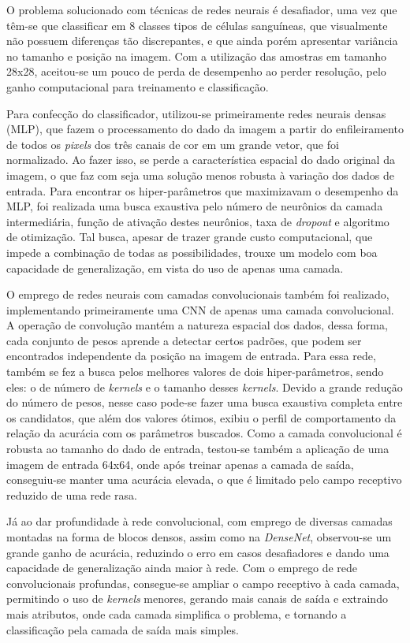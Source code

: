 O problema solucionado com técnicas de redes neurais é desafiador, uma vez que têm-se que classificar em 8 classes tipos de células sanguíneas, que visualmente não possuem diferenças tão discrepantes, e que ainda porém apresentar variância no tamanho e posição na imagem. Com a utilização das amostras em tamanho 28x28, aceitou-se um pouco de perda de desempenho ao perder resolução, pelo ganho computacional para treinamento e classificação.

Para confecção do classificador, utilizou-se primeiramente redes neurais densas (MLP), que fazem o processamento do dado da imagem a partir do enfileiramento de todos os \textit{pixels} dos três canais de cor em um grande vetor, que foi normalizado. Ao fazer isso, se perde a característica espacial do dado original da imagem, o que faz com seja uma solução menos robusta à variação dos dados de entrada. Para encontrar os hiper-parâmetros que maximizavam o desempenho da MLP, foi realizada uma busca exaustiva pelo número de neurônios da camada intermediária, função de ativação destes neurônios, taxa de \textit{dropout} e algoritmo de otimização. Tal busca, apesar de trazer grande custo computacional, que impede a combinação de todas as possibilidades, trouxe um modelo com boa capacidade de generalização, em vista do uso de apenas uma camada.

O emprego de redes neurais com camadas convolucionais também foi realizado, implementando primeiramente uma CNN de apenas uma camada convolucional. A operação de convolução mantém a natureza espacial dos dados, dessa forma, cada conjunto de pesos aprende a detectar certos padrões, que podem ser encontrados independente da posição na imagem de entrada. Para essa rede, também se fez a busca pelos melhores valores de dois hiper-parâmetros, sendo eles: o de número de \textit{kernels} e o tamanho desses \textit{kernels}. Devido a grande redução do número de pesos, nesse caso pode-se fazer uma busca exaustiva completa entre os candidatos, que além dos valores ótimos, exibiu o perfil de comportamento da relação da acurácia com os parâmetros buscados. Como a camada convolucional é robusta ao tamanho do dado de entrada, testou-se também a aplicação de uma imagem de entrada 64x64, onde após treinar apenas a  camada de saída, conseguiu-se manter uma acurácia elevada, o que é limitado pelo campo receptivo reduzido de uma rede rasa. 

Já ao dar profundidade à rede convolucional, com emprego de diversas camadas montadas na forma de blocos densos, assim como na \textit{DenseNet}, observou-se um grande ganho de acurácia, reduzindo o erro em casos desafiadores e dando uma capacidade de generalização ainda maior à rede. Com o emprego de rede convolucionais profundas, consegue-se ampliar o campo receptivo à cada camada, permitindo o uso de \textit{kernels} menores, gerando mais canais de saída e extraindo mais atributos, onde cada camada simplifica o problema, e tornando a classificação pela camada de saída mais simples.

